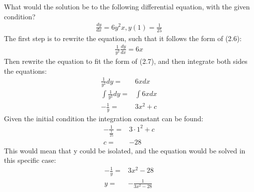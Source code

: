 \begin{tcolorbox}[colback=red!5!white,colframe=red!55!black,title=Example using separable differential equation] 
What would the solution be to the following differential equation, with the given condition?
\begin{align*}
	\frac{dy}{dx} = 6y^2x, y(1)=\frac{1}{25}
\end{align*}
The first step is to rewrite the equation, such that it follows the form of (2.6):
\begin{align*}
	\frac{1}{y^2}\frac{dy}{dx}=6x
\end{align*}
Then rewrite the equation to fit the form of (2.7), and then integrate both sides the equations:
\begin{align*}
	\frac{1}{y^2}dy=&6x dx				\\
	\int \frac{1}{y^2}dy=&\int 6x dx		\\
	-\frac{1}{y}=&3x^2+c		
\end{align*}
Given the initial condition the integration constant can be found:
\begin{align*}
	-\frac{1}{\frac{1}{25}}=&3\cdot 1^2+c	\\
	c=&-28
\end{align*}
This would mean that y could be isolated, and the equation would be solved in this specific case:
\begin{align*}
	-\frac{1}{y}=&3x^2-28\\
	y=&-\frac{1}{3x^2-28}
\end{align*}
\end{tcolorbox}

